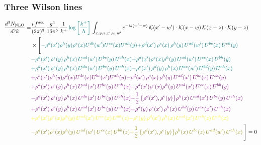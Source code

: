 \documentclass[9pt]{article}
\numberwithin{equation}{section}
\begin{document}
\subsubsection{Three Wilson lines}
\begin{align}
\frac{d^{3}N_{\rm NLO}}{d^{3}k}= &\frac{i\,f^{abc}}{(2\pi)^{3}}\,\frac{g^{4}}{16\pi^{5}}\,\frac{1}{k^{+}}\,{\color{teal}\log{\left[\frac{k^{+}}{\Lambda}\right]}}\,\int_{x,y,z,x',w,w'}e^{-ik(w'-w)}\,\mathcal{K}(x'-w')\cdot\mathcal{K}(x-w)\,\mathcal{K}(x-z)\cdot\mathcal{K}(y-z)\notag\\
&\times\Bigg[{\color{teal}-\rho^{d}(x') \rho^{h}(y) \rho^{e}(x) U^{d b}(w') U^{e c}(x) U^{a h}(y)} {\color{teal}+\rho^{d}(x')\,\rho^{e}(x)\,\rho^{h}(y)\,U^{ad}(w')\,U^{be}(x)\,U^{ch}(y)} \notag \\ &{\color{teal}-\rho^{d}(x')\,\rho^{e}(y)\,\rho^{h}(x)\,U^{ad}(w')\,U^{be}(y)\,U^{ch}(x)}{\color{teal}+\rho^{d}(x')\rho^{e}(x)\rho^{h}(y)\, U^{ad}(w')\,U^{ce}(x)\, U^{bh}(y)}\notag \\ &{\color{teal}+\rho^{d}(x')\, \rho^{e}(y)\,\rho^{h}(x)\, U^{da}(w')\,U^{be}(y)\,U^{ch}(x)}{\color{teal}-\rho^{e}(x')\,\rho^{d}(y)\,\rho^{h}(x)\,U^{ae}(w')\,U^{bd}(y)\,U^{ch}(x)}\notag \\ &{\color{violet}+\rho^{e}(x') \rho^{h}(y) \rho^{d}(x) U^{d c}(x) U^{b e}(x') U^{a h}(y)}{\color{violet}-\rho^{d}(x')\,\rho^{e}(x)\,\rho^{h}(y)\,U^{ad}(x')\,U^{be}(x)\,U^{ch}(y)}\notag \\ &{\color{violet}+\rho^{d}(x')\,\rho^{e}(y)\,\rho^{h}(x)\,U^{ad}(x')\,U^{be}(y)\,U^{ch}(x)}{\color{violet}-\rho^{d}(x')\rho^{e}(x)\rho^{h}(y)\, U^{ad}(x')\,U^{ce}(x)\, U^{bh}(y)}\notag \\ &{\color{violet}-\rho^{d}(x')\, \rho^{e}(y)\,\rho^{h}(x)\, U^{da}(x')\,U^{be}(y)\,U^{ch}(x)}{\color{violet}-\frac{1}{2}\,\big\{\rho^{d}(x'),\rho^{e}(y)\big\}\rho^{h}(x)\,U^{ad}(x')\,U^{be}(y)\,U^{ch}(x)}\notag \\ & {\color{violet}+\rho^{d}(x')\,\rho^{e}(y)\,\rho^{h}(x)\,U^{ad}(x')\,U^{be}(y)\,U^{ch}(x)}{\color{violet}+\rho^{d}(y)\,\rho^{e}(x')\,\rho^{h}(x)\,U^{bd}(y)\,U^{ae}(x')\,U^{ch}(x)}\notag \\ & {\color{yellow}+\rho^{d}(x')\rho^{e}(x)\rho^{h}(y)\, U^{ad}(x')\,U^{ce}(x)\, U^{bh}(z)}{\color{yellow}-\rho^{e}(y)\,\rho^{d}(x')\,\rho^{h}(x)\,U^{ad}(x')\,U^{eb}(z)\,U^{ch}(x)}\notag \\
&{\color{olive}-\rho^{d}(x')\rho^{e}(x)\rho^{h}(y)\, U^{ad}(w')\,U^{ce}(x)\, U^{bh}(z)}{\color{olive}+\frac{1}{2}\,\big\{\rho^{d}(x'),\rho^{e}(y)\big\}\rho^{h}(x)\,U ^{be}(z)\,U^{ad}(w')\,U^{ch}(x)}\,\Bigg] = 0 
\end{align}
\end{document}
